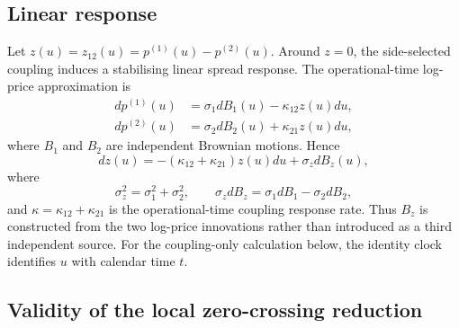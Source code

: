 \documentclass[5p,final]{elsarticle}
\begin{document}
\subsection{Linear response}

Let $z(u)=z_{12}(u)=p^{(1)}(u)-p^{(2)}(u)$. Around $z=0$, the side-selected coupling induces a stabilising linear spread response. The operational-time log-price approximation is
\begin{align}
    dp^{(1)}(u) &= \sigma_1dB_1(u)-\kappa_{12}z(u)du,\\
    dp^{(2)}(u) &= \sigma_2dB_2(u)+\kappa_{21}z(u)du,
\end{align}
where $B_1$ and $B_2$ are independent Brownian motions. Hence
\begin{equation}
    dz(u)=-(\kappa_{12}+\kappa_{21})z(u)du+\sigma_zdB_z(u),
\end{equation}
where
\begin{equation}
    \sigma_z^2=\sigma_1^2+\sigma_2^2,
    \qquad
    \sigma_zdB_z=\sigma_1dB_1-\sigma_2dB_2,
\end{equation}
and $\kappa=\kappa_{12}+\kappa_{21}$ is the operational-time coupling response rate. Thus $B_z$ is constructed from the two log-price innovations rather than introduced as a third independent source. For the coupling-only calculation below, the identity clock identifies $u$ with calendar time $t$.

\subsection{Validity of the local zero-crossing reduction}
\end{document}
